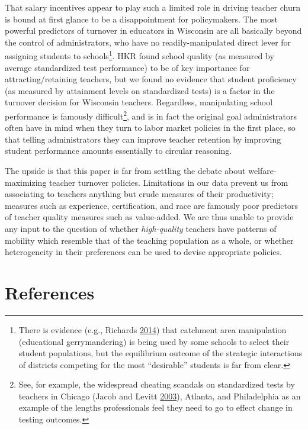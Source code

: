 \documentclass[12pt,]{article}
\let\rmarkdownfootnote\footnote%
\def\footnote{\protect\rmarkdownfootnote}
\begin{document}
That salary incentives appear to play such a limited role in driving
teacher churn is bound at first glance to be a disappointment for
policymakers. The most powerful predictors of turnover in educators in
Wisconsin are all basically beyond the control of administrators, who
have no readily-manipulated direct lever for assigning students to
schools\footnote{There is evidence (e.g., Richards
  \protect\hyperlink{ref-richards}{2014}) that catchment area
  manipulation (educational gerrymandering) is being used by some
  schools to select their student populations, but the equilibrium
  outcome of the strategic interactions of districts competing for the
  most ``desirable'' students is far from clear.}. HKR found school
quality (as measured by average standardized test performance) to be of
key importance for attracting/retaining teachers, but we found no
evidence that student proficiency (as measured by attainment levels on
standardized tests) is a factor in the turnover decision for Wisconsin
teachers. Regardless, manipulating school performance is famously
difficult\footnote{See, for example, the widespread cheating scandals on
  standardized tests by teachers in Chicago (Jacob and Levitt
  \protect\hyperlink{ref-jacob}{2003}), Atlanta, and Philadelphia as an
  example of the lengths professionals feel they need to go to effect
  change in testing outcomes.}, and is in fact the original goal
administrators often have in mind when they turn to labor market
policies in the first place, so that telling administrators they can
improve teacher retention by improving student performance amounts
essentially to circular reasoning.

The upside is that this paper is far from settling the debate about
welfare-maximizing teacher turnover policies. Limitations in our data
prevent us from associating to teachers anything but crude measures of
their productivity; measures such as experience, certification, and race
are famously poor predictors of teacher quality measures such as
value-added. We are thus unable to provide any input to the question of
whether \emph{high-quality} teachers have patterns of mobility which
resemble that of the teaching population as a whole, or whether
heterogeneity in their preferences can be used to devise appropriate
policies.

\section*{References}\label{references}
\end{document}
